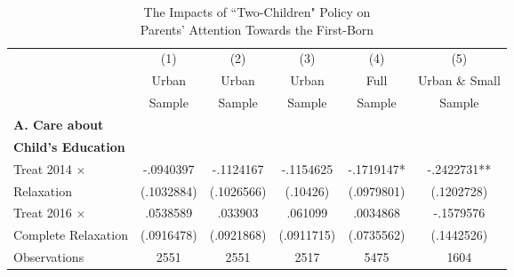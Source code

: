 \documentclass[12pt]{extarticle}
\begin{document}
\begin{table}
\centering
\caption{The Impacts of ``Two-Children" Policy on \\ Parents' Attention Towards the First-Born} \label{app:parentatt}
\begin{threeparttable}
\def\sym#1{\ifmmode^{#1}\else\(^{#1}\)\fi}
\begin{tabular}{l*{5}{c}}
\hline\hline
                    &\multicolumn{1}{c}{(1)}&\multicolumn{1}{c}{(2)}&\multicolumn{1}{c}{(3)}&\multicolumn{1}{c}{(4)}&\multicolumn{1}{c}{(5)}\\
	                &\multicolumn{1}{c}{Urban}&\multicolumn{1}{c}{Urban}&\multicolumn{1}{c}{Urban}&\multicolumn{1}{c}{Full}&\multicolumn{1}{c}{Urban \& Small}\\
		&\multicolumn{1}{c}{Sample}&\multicolumn{1}{c}{Sample}&\multicolumn{1}{c}{Sample}&\multicolumn{1}{c}{Sample}&\multicolumn{1}{c}{Sample}\\
\hline

\textbf{A. Care about} \\
\qquad \textbf{Child's Education} \\
Treat 2014 $\times$ &   -.0940397   &   -.1124167   &   -.1154625   &   -.1719147*  &   -.2422731** \\
\quad 2014 Relaxation     &  (.1032884)   &  (.1026566)   &    (.10426)   &  (.0979801)   &  (.1202728)   \\
Treat 2016 $\times$ &    .0538589   &     .033903   &     .061099   &    .0034868   &   -.1579576   \\
\quad Complete Relaxation &  (.0916478)   &  (.0921868)   &  (.0911715)   &  (.0735562)   &  (.1442526)   \\
Observations        &        2551   &        2551   &        2517   &        5475   &        1604   \\


\end{tabular}
\end{threeparttable}
\end{table}
\end{document}
